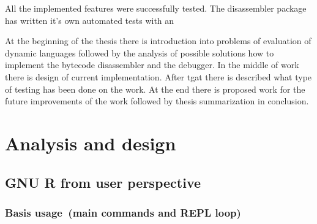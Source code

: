 \documentclass[thesis=M,english]{FITthesis}[2018/10/20]
\begin{document}
All the implemented features were successfully tested. The disassembler package has written it's own automated tests with an

At the beginning of the thesis there is introduction into problems of evaluation of dynamic languages followed by the analysis of possible solutions how to implement the bytecode disassembler and the debugger. In the middle of work there is design of current implementation. After tgat there is described what type of testing has been done on the work. At the end there is proposed work for the future improvements of the work followed by thesis summarization in conclusion.





\chapter{Analysis and design}

\section{GNU R from user perspective}\label{R-UI}

\subsection{Basis usage~(main commands and REPL loop)}\label{R-UI}
\end{document}

